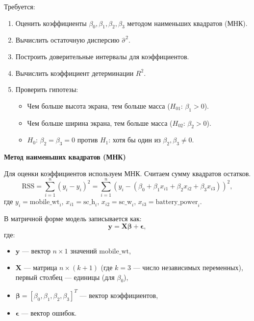 \documentclass[14pt]{extreport}
\begin{document}
Требуется:
\begin{enumerate}
    \item Оценить коэффициенты \(\beta_0, \beta_1, \beta_2, \beta_3\) методом наименьших квадратов (МНК).
    \item Вычислить остаточную дисперсию \(\hat{\sigma}^2\).
    \item Построить доверительные интервалы для коэффициентов.
    \item Вычислить коэффициент детерминации \(R^2\).
    \item Проверить гипотезы:
    \begin{itemize}
        \item Чем больше высота экрана, тем больше масса (\(H_{01}\): \(\beta_1 > 0\)).
        \item Чем больше ширина экрана, тем больше масса (\(H_{02}\): \(\beta_2 > 0\)).
        \item \(H_0\): \(\beta_2 = \beta_3 = 0\) против \(H_1\): хотя бы один из \(\beta_2, \beta_3 \neq 0\).
    \end{itemize}
\end{enumerate}

\textbf{Метод наименьших квадратов (МНК)}

Для оценки коэффициентов используем МНК. Считаем сумму квадратов остатков.
\begin{equation}
\text{RSS} = \sum_{i=1}^n (y_i - \hat{y}_i)^2 = \sum_{i=1}^n (y_i - (\beta_0 + \beta_1 x_{i1} + \beta_2 x_{i2} + \beta_3 x_{i3}))^2,
\end{equation}
где \(y_i = \text{mobile\_wt}_i\), \(x_{i1} = \text{sc\_h}_i\), \(x_{i2} = \text{sc\_w}_i\), \(x_{i3} = \text{battery\_power}_i\).

В матричной форме модель записывается как:
\begin{equation}
\mathbf{y} = \mathbf{X} \mathbf{\beta} + \mathbf{\epsilon},
\end{equation}
где:
\begin{itemize}
    \item \(\mathbf{y}\) — вектор \(n \times 1\) значений \(\text{mobile\_wt}\),
    \item \(\mathbf{X}\) — матрица \(n \times (k+1)\) (где \(k = 3\) — число независимых переменных), первый столбец — единицы (для \(\beta_0\)),
    \item \(\mathbf{\beta} = [\beta_0, \beta_1, \beta_2, \beta_3]^T\) — вектор коэффициентов,
    \item \(\mathbf{\epsilon}\) — вектор ошибок.
\end{itemize}
\end{document}
